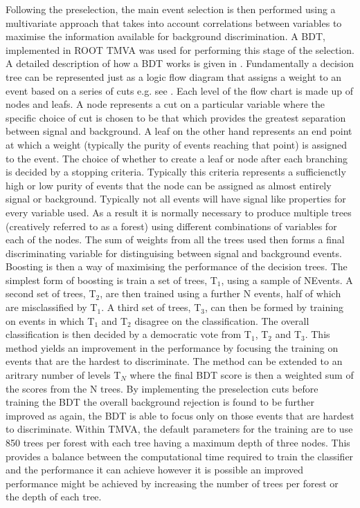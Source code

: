 Following the preselection, the main event selection is then performed using a multivariate approach that takes into account correlations between variables to maximise the information available for background discrimination. A \ac{BDT}, implemented in ROOT TMVA \cite{2007physics...3039H} was used for performing this stage of the selection. A detailed description of how a BDT works is given in \cite{Coadou:2013lca}. Fundamentally a decision tree can be represented just as a logic flow diagram that assigns a weight to an event based on a series of cuts e.g. see . Each level of the flow chart is made up of nodes and leafs. A node represents a cut on a particular variable where the specific choice of cut is chosen to be that which provides the greatest separation between signal and background. A leaf on the other hand represents an end point at which a weight (typically the purity of events reaching that point) is assigned to the event. The choice of whether to create a leaf or node after each branching is decided by a stopping criteria. Typically this criteria represents a sufficienctly high or low purity of events that the node can be assigned as almost entirely signal or background. Typically not all events will have signal like properties for every variable used. As a result it is normally necessary to produce multiple trees (creatively referred to as a forest) using different combinations of variables for each of the nodes. The sum of weights from all the trees used then forms a final discriminating variable for distinguising between signal and background events. Boosting is then a way of maximising the performance of the decision trees. The simplest form of boosting is train a set of trees, T$_1$, using a sample of NEvents. A second set of trees, T$_2$, are then trained using a further N events, half of which are misclassified by T$_1$. A third set of trees, T$_3$,  can then be formed by training on events in which T$_1$ and T$_2$ disagree on the classification. The overall classification is then decided by a democratic vote from T$_1$, T$_2$ and T$_3$. This method yields an improvement in the performance by focusing the training on events that are the hardest to discriminate. The method can be extended to an aritrary number of levels T$_N$ where the final \ac{BDT} score is then a weighted sum of the scores from the N trees. By implementing the preselection cuts before training the \ac{BDT} the overall background rejection is found to be further improved as again, the \ac{BDT} is able to focus only on those events that are hardest to discriminate. Within TMVA, the default parameters for the training are to use 850 trees per forest with each tree having a maximum depth of three nodes. This provides a balance between the computational time required to train the classifier and the performance it can achieve however it is possible an improved performance might be achieved by increasing the number of trees per forest or the depth of each tree. 

